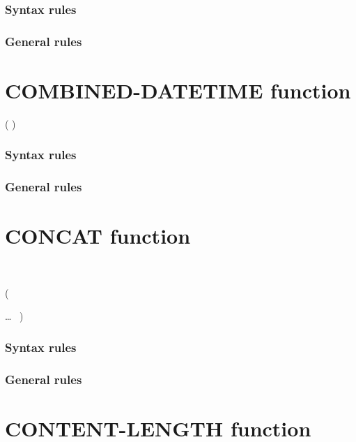 \subsubsection{Syntax rules}

\subsubsection{General rules}

\section{COMBINED-DATETIME function}

\begin{syntax}
    ( \argument \argument )
\end{syntax}

\subsubsection{Syntax rules}

\subsubsection{General rules}

\section{CONCAT function}

\begin{syntax}
  \begin{1=}
     \\
  \end{1=}
  (
  \begin{1=}
    \argument
  \end{1=}
  \ldots
  \ {})
\end{syntax}

\subsubsection{Syntax rules}

\subsubsection{General rules}

\section{CONTENT-LENGTH function}

